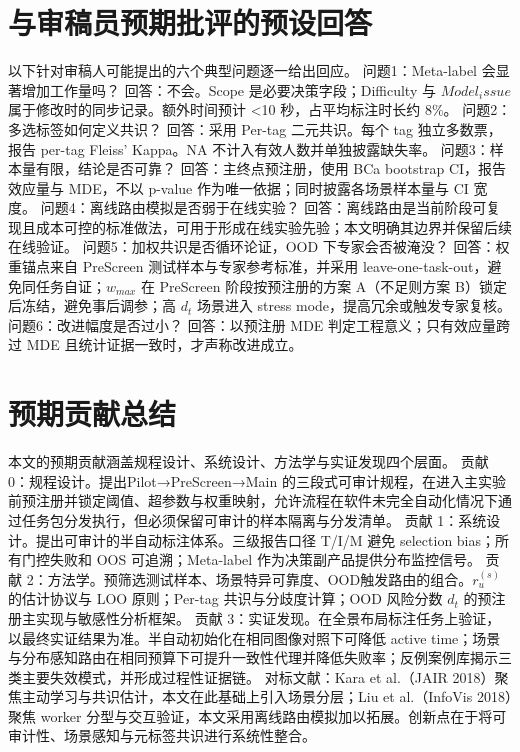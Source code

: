 \documentclass[journal,onecolumn]{IEEEtran}
\begin{document}
\section{与审稿员预期批评的预设回答}

以下针对审稿人可能提出的六个典型问题逐一给出回应。
问题1：Meta-label 会显著增加工作量吗？
回答：不会。Scope 是必要决策字段；Difficulty 与 $Model_issue$ 属于修改时的同步记录。额外时间预计 <10 秒，占平均标注时长约 8\%。
问题2：多选标签如何定义共识？
回答：采用 Per-tag 二元共识。每个 tag 独立多数票，报告 per-tag Fleiss' Kappa。NA 不计入有效人数并单独披露缺失率。
问题3：样本量有限，结论是否可靠？
回答：主终点预注册，使用 BCa bootstrap CI，报告效应量与 MDE，不以 p-value 作为唯一依据；同时披露各场景样本量与 CI 宽度。
问题4：离线路由模拟是否弱于在线实验？
回答：离线路由是当前阶段可复现且成本可控的标准做法，可用于形成在线实验先验；本文明确其边界并保留后续在线验证。
问题5：加权共识是否循环论证，OOD 下专家会否被淹没？
回答：权重锚点来自 PreScreen 测试样本与专家参考标准，并采用 leave-one-task-out，避免同任务自证；$w_{max}$ 在 PreScreen 阶段按预注册的方案 A（不足则方案 B）锁定后冻结，避免事后调参；高 $d_{t}$ 场景进入 stress mode，提高冗余或触发专家复核。
问题6：改进幅度是否过小？
回答：以预注册 MDE 判定工程意义；只有效应量跨过 MDE 且统计证据一致时，才声称改进成立。

\section{预期贡献总结}

本文的预期贡献涵盖规程设计、系统设计、方法学与实证发现四个层面。
贡献 0：规程设计。提出Pilot→PreScreen→Main 的三段式可审计规程，在进入主实验前预注册并锁定阈值、超参数与权重映射，允许流程在软件未完全自动化情况下通过任务包分发执行，但必须保留可审计的样本隔离与分发清单。
贡献 1：系统设计。提出可审计的半自动标注体系。三级报告口径 T/I/M 避免 selection bias；所有门控失败和 OOS 可追溯；Meta-label 作为决策副产品提供分布监控信号。
贡献 2：方法学。预筛选测试样本、场景特异可靠度、OOD触发路由的组合。$r_{u}^{(s)}$ 的估计协议与 LOO 原则；Per-tag 共识与分歧度计算；OOD 风险分数 $d_{t}$ 的预注册主实现与敏感性分析框架。
贡献 3：实证发现。在全景布局标注任务上验证，以最终实证结果为准。半自动初始化在相同图像对照下可降低 active time；场景与分布感知路由在相同预算下可提升一致性代理并降低失败率；反例案例库揭示三类主要失效模式，并形成过程性证据链。
对标文献：Kara et al.（JAIR 2018）聚焦主动学习与共识估计，本文在此基础上引入场景分层；Liu et al.（InfoVis 2018）聚焦 worker 分型与交互验证，本文采用离线路由模拟加以拓展。创新点在于将可审计性、场景感知与元标签共识进行系统性整合。
\end{document}
